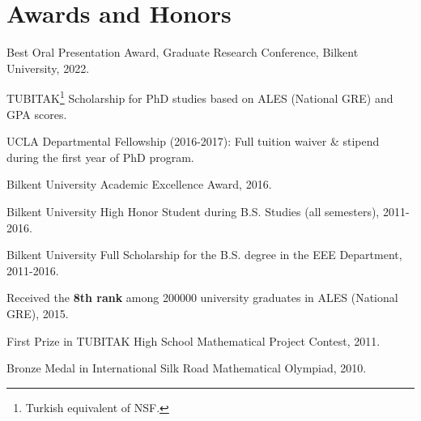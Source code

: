 \section{Awards and Honors}
\begin{outerlist}
	\item Best Oral Presentation Award, Graduate Research Conference, Bilkent University, 2022.
     \item TUBITAK\footnote{Turkish equivalent of NSF.} Scholarship for PhD studies based on ALES (National GRE) and GPA scores.
     \item  UCLA  Departmental Fellowship (2016-2017): Full tuition waiver \& stipend during the first year of PhD program.
    \item Bilkent University Academic Excellence Award, 2016.
    \item Bilkent University High Honor Student during B.S. Studies (all semesters), 2011-2016.
    \item Bilkent University Full Scholarship for the B.S. degree in the EEE Department, 2011-2016.
    \item Received the \textbf{8th rank} among 200000 university graduates in ALES (National GRE), 2015.
    \item First Prize in TUBITAK High School Mathematical Project Contest, 2011.
 	\item Bronze Medal in International Silk Road Mathematical Olympiad, 2010. 

\end{outerlist}

